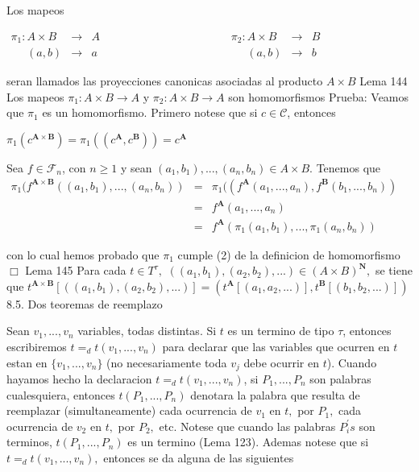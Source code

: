 Los mapeos

\(\displaystyle \begin{array}{lll} \pi _{1}:A\times B & \rightarrow & A \\ \;\;\;\;\;(a,b) & \rightarrow & a \end{array} \ \ \ \ \ \ \ \ \ \ \ \ \ \ \ \ \ \ \ \ \ \ \ \ \ \ \ \ \ \ \ \ \ \ \ \ \ \ \ \ \ \ \ \ \ \ \ \ \ \begin{array}{lll} \pi _{2}:A\times B & \rightarrow & B \\ \;\;\;\;\;(a,b) & \rightarrow & b \end{array} \)

seran llamados las proyecciones canonicas asociadas al producto \( A\times B\)
Lema 144 Los mapeos \(\pi _{1}:A\times B\rightarrow A\) y \(\pi _{2}:A\times B\rightarrow A\) son homomorfismos
Prueba: Veamos que \(\pi _{1}\) es un homomorfismo. Primero notese que si \(c\in \mathcal{C}\), entonces

\(\displaystyle \pi _{1}(c^{\mathbf{A}\times \mathbf{B}})=\pi _{1}((c^{\mathbf{A}},c^{ \mathbf{B}}))=c^{\mathbf{A}} \)

Sea \(f\in \mathcal{F}_{n}\), con \(n\geq 1\) y sean \( (a_{1},b_{1}),...,(a_{n},b_{n})\in A\times B\). Tenemos que
\(\displaystyle \begin{array}{ccl} \pi _{1}(f^{\mathbf{A}\times \mathbf{B}}((a_{1},b_{1}),...,(a_{n},b_{n})) & = & \pi _{1}((f^{\mathbf{A}}(a_{1},...,a_{n}),f^{\mathbf{B}}(b_{1},...,b_{n})) \\ & = & f^{\mathbf{A}}(a_{1},...,a_{n}) \\ & = & f^{\mathbf{A}}(\pi _{1}(a_{1},b_{1}),...,\pi _{1}(a_{n},b_{n})) \end{array} \)

con lo cual hemos probado que \(\pi _{1}\) cumple (2) de la definicion de homomorfismo \(\Box\)
Lema 145 Para cada \(t\in T^{\tau },\) \(((a_{1},b_{1}),(a_{2},b_{2}),...)\in (A\times B)^{\mathbf{N}},\) se tiene que \(t^{\mathbf{A}\times \mathbf{B} }[((a_{1},b_{1}),(a_{2},b_{2}),...)]=(t^{\mathbf{A}}[(a_{1},a_{2},...)],t^{ \mathbf{B}}[(b_{1},b_{2},...)])\)
8.5. Dos teoremas de reemplazo

Sean \(v_{1},...,v_{n}\) variables, todas distintas. Si \(t\) es un termino de tipo \(\tau \), entonces escribiremos \(t=_{d}t(v_{1},...,v_{n})\) para declarar que las variables que ocurren en \(t\) estan en \(\{v_{1},...,v_{n}\}\) (no necesariamente toda \(v_{j}\) debe ocurrir en \(t\)). Cuando hayamos hecho la declaracion \(t=_{d}t(v_{1},...,v_{n})\), si \(P_{1},...,P_{n}\) son palabras cualesquiera, entonces \(t(P_{1},...,P_{n})\) denotara la palabra que resulta de reemplazar (simultaneamente) cada ocurrencia de \(v_{1}\) en \(t,\) por \( P_{1},\) cada ocurrencia de \(v_{2}\) en \(t,\) por \(P_{2},\) etc. Notese que cuando las palabras \(P_{i}^{\prime }s\) son terminos, \(t(P_{1},...,P_{n})\) es un termino (Lema 123). Ademas notese que si \( t=_{d}t(v_{1},...,v_{n}),\) entonces se da alguna de las siguientes

